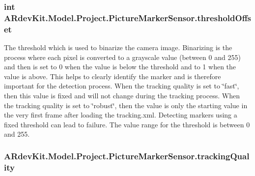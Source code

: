 \hypertarget{class_a_rdev_kit_1_1_model_1_1_project_1_1_picture_marker_sensor_ae8164ddea1bcb20ca7f5b3e646b6c924}{
\subsubsection[{threshold\-Offset}]{\setlength{\rightskip}{0pt plus 5cm}int A\-Rdev\-Kit.\-Model.\-Project.\-Picture\-Marker\-Sensor.\-threshold\-Offset\hspace{0.3cm}{\ttfamily [protected]}}}\label{class_a_rdev_kit_1_1_model_1_1_project_1_1_picture_marker_sensor_ae8164ddea1bcb20ca7f5b3e646b6c924}


The threshold which is used to binarize the camera image. Binarizing is the process where each pixel is converted to a grayscale value (between 0 and 255) and then is set to 0 when the value is below the threshold and to 1 when the value is above. This helps to clearly identify the marker and is therefore important for the detection process. When the tracking quality is set to \char`\"{}fast\char`\"{}, then this value is fixed and will not change during the tracking process. When the tracking quality is set to \char`\"{}robust\char`\"{}, then the value is only the starting value in the very first frame after loading the tracking.\-xml. Detecting markers using a fixed threshold can lead to failure. The value range for the threshold is between 0 and 255. 

\hypertarget{class_a_rdev_kit_1_1_model_1_1_project_1_1_picture_marker_sensor_aca44e5fc01c413ccf52a6566ee98ec70}{
\subsubsection[{tracking\-Quality}]{ A\-Rdev\-Kit.\-Model.\-Project.\-Picture\-Marker\-Sensor.\-tracking\-Quality\hspace{0.3cm}{\ttfamily [protected]}}}\label{class_a_rdev_kit_1_1_model_1_1_project_1_1_picture_marker_sensor_aca44e5fc01c413ccf52a6566ee98ec70}


